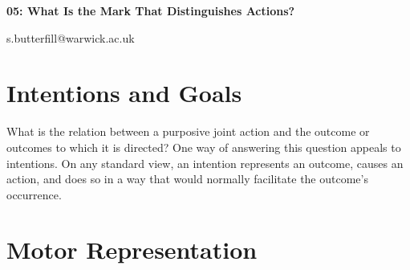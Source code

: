 \documentclass[12pt]{extarticle}
\date{}
\makeatletter
\def \ititle {Philosophical Psychology}
\def \iemail{s.butterfill@warwick.ac.uk}
\makeatother
\begin{document}
\begin{multicols*}{3}

\setlength\footnotesep{1em}











      
\def \ititle {05: What Is the Mark That Distinguishes Actions?}
 
\begin{center}
 
{\Large
 
\textbf{\ititle}
 
}
 
 
 
\iemail %
 
\end{center}
 
 
 
 
\section{Intentions and Goals}
 
What is the relation between a purposive joint action and the outcome or outcomes to which it is directed?
One way of answering this question appeals to intentions.
On any standard view, an intention
represents an outcome, causes an action, and does so in a way that would normally facilitate
the outcome’s occurrence. 
 
 
\section{Motor Representation}
 

\end{multicols*}
\end{document}
